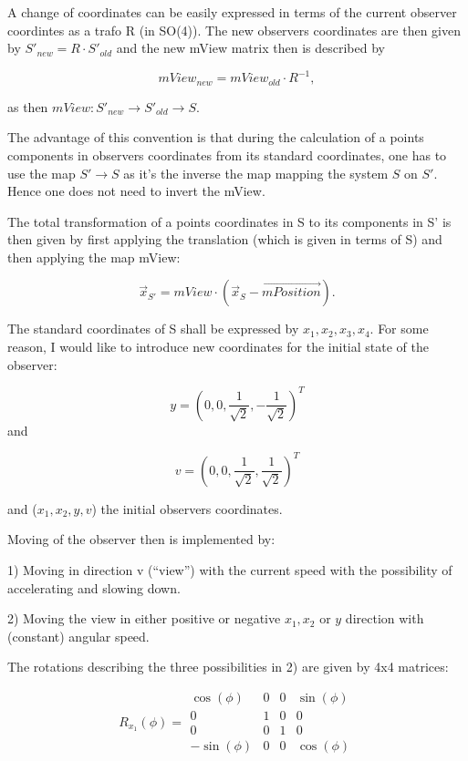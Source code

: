 \documentclass[titlepage]{scrartcl}
\begin{document}
A change of coordinates can be easily expressed in terms of the current observer coordintes as a trafo R (in SO(4)). The new observers coordinates are then given by $S'_{new} = R \cdot S'_{old}$ and the new mView matrix then is described by 

\begin{equation}
mView_{new} = mView_{old} \cdot R^{-1},
\end{equation}

as then $mView : S'_{new} \to S'_{old} \to S$.

The advantage of this convention is that during the calculation of a points components in observers coordinates from its standard coordinates, one has to use the map $S' \to S$ as it's the inverse the map mapping the system $S$ on $S'$. Hence one does not need to invert the mView.

The total transformation of a points coordinates in S to its components in S' is then given by first applying the translation (which is given in terms of S) and then applying the map mView:

\begin{equation}
\vec{x}_{S'} = mView \cdot (\vec{x}_S - \vec{mPosition}).
\end{equation}

The standard coordinates of S shall be expressed by $x_1, x_2, x_3, x_4$. For some reason, I would like to introduce new coordinates for the initial state of the observer: 

\begin{equation}
y = (0, 0, \frac{1}{\sqrt{2}}, -\frac{1}{\sqrt{2}})^T
\end{equation} and

\begin{equation}
v = (0, 0, \frac{1}{\sqrt{2}}, \frac{1}{\sqrt{2}})^T
\end{equation}

and ($x_1, x_2, y, v$) the initial observers coordinates. 

Moving of the observer then is implemented by: 

1) Moving in direction v (\enquote{view}) with the current speed with the possibility of accelerating and slowing down. 

2) Moving the view in either positive or negative $x_1, x_2$ or $y$ direction with (constant) angular speed. 

The rotations describing the three possibilities in 2) are given by 4x4 matrices: 

\begin{equation}
R_{x_1}(\phi) = \begin{array}{cccc}
\cos(\phi) & 0 & 0 & \sin(\phi) \\ 
0 & 1 & 0 & 0 \\ 
0 & 0 & 1 & 0 \\ 
-\sin(\phi) & 0 & 0 & \cos(\phi)
\end{array} 
\end{equation}
\end{document}
